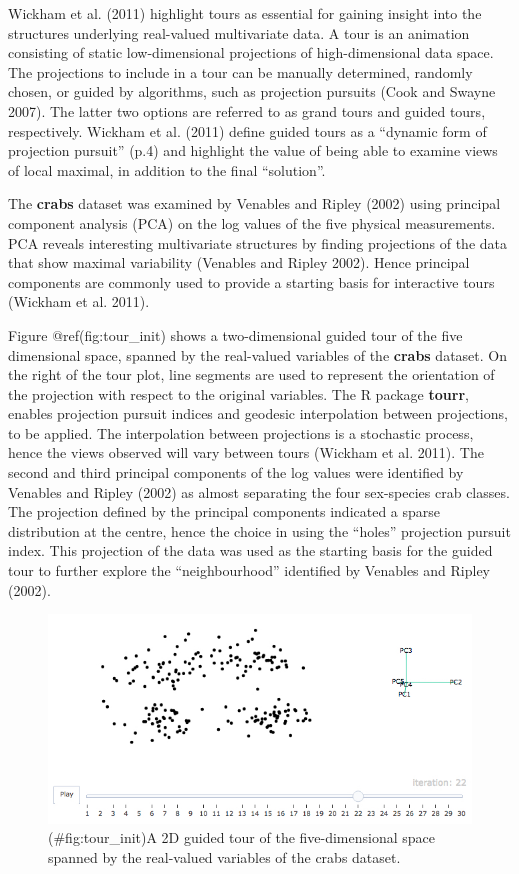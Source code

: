\documentclass[]{book}
\theoremstyle{definition}
\theoremstyle{definition}
\theoremstyle{definition}
\theoremstyle{remark}
\begin{document}
Wickham et al. (2011) highlight tours as essential for gaining insight
into the structures underlying real-valued multivariate data. A tour is
an animation consisting of static low-dimensional projections of
high-dimensional data space. The projections to include in a tour can be
manually determined, randomly chosen, or guided by algorithms, such as
projection pursuits (Cook and Swayne 2007). The latter two options are
referred to as grand tours and guided tours, respectively. Wickham et
al. (2011) define guided tours as a ``dynamic form of projection
pursuit'' (p.4) and highlight the value of being able to examine views
of local maximal, in addition to the final ``solution''.

The \textbf{crabs} dataset was examined by Venables and Ripley (2002)
using principal component analysis (PCA) on the log values of the five
physical measurements. PCA reveals interesting multivariate structures
by finding projections of the data that show maximal variability
(Venables and Ripley 2002). Hence principal components are commonly used
to provide a starting basis for interactive tours (Wickham et al. 2011).

Figure @ref(fig:tour\_init) shows a two-dimensional guided tour of the
five dimensional space, spanned by the real-valued variables of the
\textbf{crabs} dataset. On the right of the tour plot, line segments are
used to represent the orientation of the projection with respect to the
original variables. The R package \textbf{tourr}, enables projection
pursuit indices and geodesic interpolation between projections, to be
applied. The interpolation between projections is a stochastic process,
hence the views observed will vary between tours (Wickham et al. 2011).
The second and third principal components of the log values were
identified by Venables and Ripley (2002) as almost separating the four
sex-species crab classes. The projection defined by the principal
components indicated a sparse distribution at the centre, hence the
choice in using the ``holes'' projection pursuit index. This projection
of the data was used as the starting basis for the guided tour to
further explore the ``neighbourhood'' identified by Venables and Ripley
(2002).

\begin{figure}[htbp]
\centering
\includegraphics{files/tour.jpg}
\caption{(\#fig:tour\_init)A 2D guided tour of the five-dimensional
space spanned by the real-valued variables of the crabs dataset.}
\end{figure}
\end{document}
